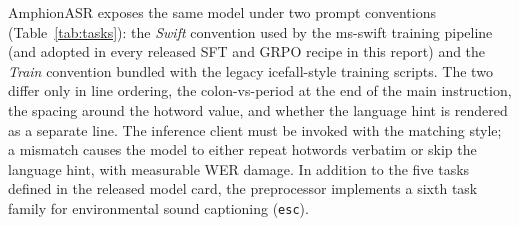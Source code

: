 AmphionASR exposes the same model under two prompt conventions
(Table~\ref{tab:tasks}): the \emph{Swift} convention used by the
ms-swift training pipeline (and adopted in every released SFT and
GRPO recipe in this report) and the \emph{Train} convention bundled
with the legacy icefall-style training scripts. The two differ only
in line ordering, the colon-vs-period at the end of the main
instruction, the spacing around the hotword value, and whether the
language hint is rendered as a separate line. The inference client
must be invoked with the matching style; a mismatch causes the model
to either repeat hotwords verbatim or skip the language hint, with
measurable WER damage. In addition to the five tasks defined in the
released model card, the preprocessor implements a sixth task family
for environmental sound captioning (\texttt{esc}).

